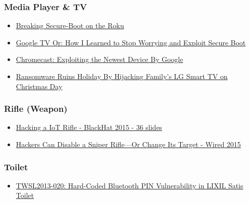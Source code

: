 \hypertarget{media-player-tv}{%
\subsubsection{Media Player \& TV}\label{media-player-tv}}

\begin{itemize}
\tightlist
\item
  \href{https://blog.exploitee.rs/2013/breaking-secure-boot-on-the-roku/}{Breaking
  Secure-Boot on the Roku}
\item
  \href{https://blog.exploitee.rs/2013/google-tv-or-how-i-learned-to-stop-worrying-and-exploit-secure-boot/}{Google
  TV Or: How I Learned to Stop Worrying and Exploit Secure Boot}
\item
  \href{https://blog.exploitee.rs/2013/chromecast-exploiting-the-newest-device-by-google/}{Chromecast:
  Exploiting the Newest Device By Google}
\item
  \href{https://www.yahoo.com/tech/ransomware-ruins-holiday-hijacking-familys-201136667.html}{Ransomware
  Ruins Holiday By Hijacking Family's LG Smart TV on Christmas Day}
\end{itemize}

\hypertarget{rifle-weapon}{%
\subsubsection{Rifle (Weapon)}\label{rifle-weapon}}

\begin{itemize}
\tightlist
\item
  \href{https://www.blackhat.com/docs/us-15/materials/us-15-Sandvik-When-IoT-Attacks-Hacking-A-Linux-Powered-Rifle.pdf}{Hacking
  a IoT Rifle - BlackHat 2015 - 36 slides}
\item
  \href{https://www.wired.com/2015/07/hackers-can-disable-sniper-rifleor-change-target/}{Hackers
  Can Disable a Sniper Rifle---Or Change Its Target - Wired 2015}
\end{itemize}

\hypertarget{toilet}{%
\subsubsection{Toilet}\label{toilet}}

\begin{itemize}
\tightlist
\item
  \href{https://www.trustwave.com/Resources/Security-Advisories/Advisories/TWSL2013-020/?fid=3872}{TWSL2013-020:
  Hard-Coded Bluetooth PIN Vulnerability in LIXIL Satis Toilet}
\end{itemize}

